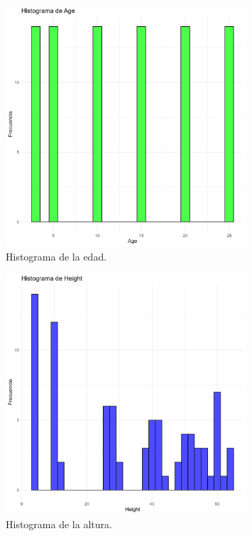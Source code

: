 \documentclass{article}
\begin{document}
\begin{figure}[htbp]
    \centering
    \includegraphics[width=0.8\textwidth]{histograma_age.png}
    \caption{Histograma de la edad.}
\end{figure}

\begin{figure}[htbp]
    \centering
    \includegraphics[width=0.8\textwidth]{histograma_height.png}
    \caption{Histograma de la altura.}
\end{figure}
\end{document}
